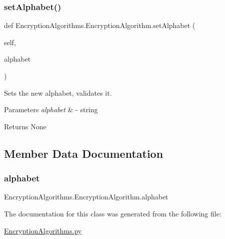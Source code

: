 \subsubsection{\texorpdfstring{set\+Alphabet()}{setAlphabet()}}
{\footnotesize\ttfamily def Encryption\+Algorithms.\+Encryption\+Algorithm.\+set\+Alphabet (\begin{DoxyParamCaption}\item[{}]{self,  }\item[{}]{alphabet }\end{DoxyParamCaption})}



Sets the new alphabet, validates it. 


\begin{DoxyParams}{Parameters}
{\em alphabet} & -\/ string\\
\hline
\end{DoxyParams}
\begin{DoxyReturn}{Returns}
None 
\end{DoxyReturn}


\subsection{Member Data Documentation}
\mbox{\label{classEncryptionAlgorithms_1_1EncryptionAlgorithm_ad43b0d5680d18b7bc62848864e496684}} 
\subsubsection{\texorpdfstring{alphabet}{alphabet}}
{\footnotesize\ttfamily Encryption\+Algorithms.\+Encryption\+Algorithm.\+alphabet}



The documentation for this class was generated from the following file\+:\begin{DoxyCompactItemize}
\item 
\mbox{\hyperlink{EncryptionAlgorithms_8py}{Encryption\+Algorithms.\+py}}\end{DoxyCompactItemize}
